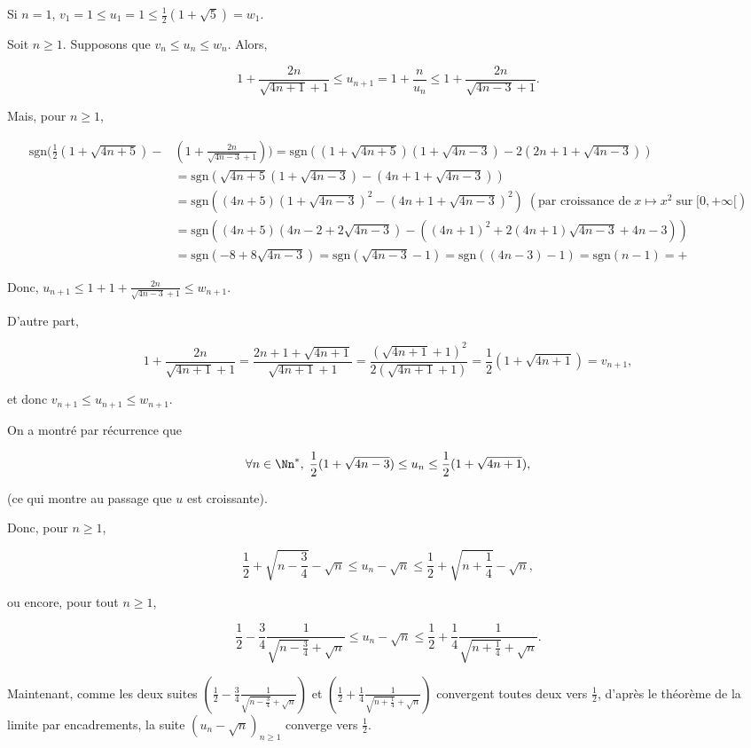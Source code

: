 {{Si $n=1$, $v_1=1\leq u_1=1\leq\frac{1}{2}(1+\sqrt{5})=w_1$.

Soit $n\geq1$. Supposons que $v_n\leq u_n\leq w_n$. Alors, 

$$1+\frac{2n}{\sqrt{4n+1}+1}\leq u_{n+1}=1+\frac{n}{u_n}\leq1+\frac{2n}{\sqrt{4n-3}+1}.$$

Mais, pour $n\geq1$,

\begin{align*}
\mbox{sgn}(\frac{1}{2}(1+\sqrt{4n+5})-&(1+\frac{2n}{\sqrt{4n-3}+1}))=\mbox{sgn}((1+\sqrt{4n+5})(1+\sqrt{4n-3})-2(2n+1+\sqrt{4n-3}))\\
 &=\mbox{sgn}(\sqrt{4n+5}(1+\sqrt{4n-3})-(4n+1+\sqrt{4n-3}))\\
 &=\mbox{sgn}((4n+5)(1+\sqrt{4n-3})^2-(4n+1+\sqrt{4n-3})^2)\;(\mbox{par croissance de}\;x\mapsto x^2\;\mbox{sur}\;[0,+\infty[)\\
 &=\mbox{sgn}((4n+5)(4n-2+2\sqrt{4n-3})-((4n+1)^2+2(4n+1)\sqrt{4n-3}+4n-3))\\
 &=\mbox{sgn}(-8+8\sqrt{4n-3}) =\mbox{sgn}(\sqrt{4n-3}-1) =\mbox{sgn}((4n-3)-1)=\mbox{sgn}(n-1)=+
\end{align*}

Donc, $u_{n+1}\leq 1+1+\frac{2n}{\sqrt{4n-3}+1}\leq w_{n+1}$.

D'autre part,

$$1+\frac{2n}{\sqrt{4n+1}+1}=\frac{2n+1+\sqrt{4n+1}}{\sqrt{4n+1}+1}=\frac{(\sqrt{4n+1}+1)^2}{2(\sqrt{4n+1}+1)}
=\frac{1}{2}(1+\sqrt{4n+1})=v_{n+1},$$ 

et donc $v_{n+1}\leq u_{n+1}\leq w_{n+1}$.

On a montré par récurrence que 

$$\forall n\in\Nn^*,\;\frac{1}{2}(1+\sqrt{4n-3})\leq u_n\leq\frac{1}{2}(1+\sqrt{4n+1}),$$

(ce qui montre au passage que $u$ est croissante).

Donc, pour $n\geq1$,

$$\frac{1}{2}+\sqrt{n-\frac{3}{4}}-\sqrt{n}\leq u_n-\sqrt{n}\leq\frac{1}{2}+\sqrt{n+\frac{1}{4}}-\sqrt{n},$$

ou encore, pour tout $n\geq1$,
 
$$\frac{1}{2}-\frac{3}{4}\frac{1}{\sqrt{n-\frac{3}{4}}+\sqrt{n}}\leq u_n-\sqrt{n}\leq\frac{1}{2}+\frac{1}{4}\frac{1}{\sqrt{n+\frac{1}{4}}+\sqrt{n}}.$$

Maintenant, comme les deux suites 
$(\frac{1}{2}-\frac{3}{4}\frac{1}{\sqrt{n-\frac{3}{4}}+\sqrt{n}})$ et $(\frac{1}{2}+\frac{1}{4}\frac{1}{\sqrt{n+\frac{1}{4}}+\sqrt{n}})$ convergent toutes deux vers $\frac{1}{2}$, d'après le théorème de la limite par encadrements, la suite $(u_n-\sqrt{n})_{n\geq1}$ converge vers $\frac{1}{2}$.
}
}
